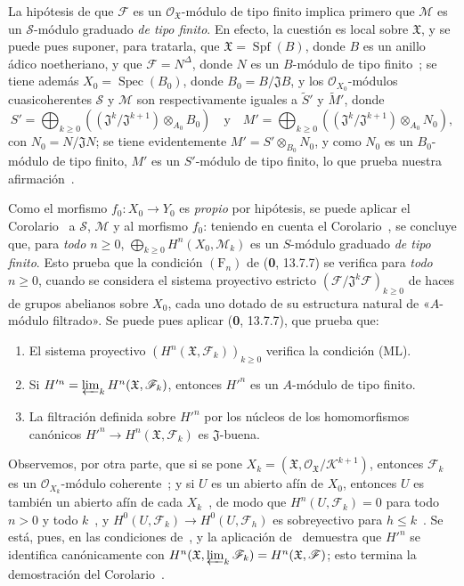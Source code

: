 La hipótesis de que $\mathcal F$ es un $\mathcal O_{\mathfrak X}$-módulo de tipo finito implica primero que $\mathcal M$ es
un $\mathcal S$-módulo graduado \emph{de tipo finito}.
En efecto, la cuestión es local sobre $\mathfrak X$, y se puede pues suponer, para tratarla, que $\mathfrak X=\operatorname{Spf}(B)$, donde $B$ es un anillo ádico noetheriano, y que $\mathcal F=N^\Delta$, donde $N$ es un $B$-módulo de tipo finito~; se tiene además $X_0=\operatorname{Spec}(B_0)$, donde $B_0=B/\mathfrak J B$, y los $\mathcal O_{X_0}$-módulos cuasicoherentes $\mathcal S$ y $\mathcal M$ son respectivamente iguales a $\widetilde{S}'$ y $\widetilde{M}'$, donde
\[
S'=\bigoplus_{k\geq0}
((\mathfrak J^k/\mathfrak J^{k+1})\otimes_{A_0}B_0)\quad\text{y}\quad
M'=\bigoplus_{k\geq0}
((\mathfrak J^k/\mathfrak J^{k+1})\otimes_{A_0}N_0),
\]
con $N_0=N/\mathfrak JN$; se tiene evidentemente $M'=S'\otimes_{B_0}N_0$, y como $N_0$ es un $B_0$-módulo de tipo finito, $M'$ es un $S'$-módulo de tipo finito, lo que prueba nuestra afirmación~.

Como el morfismo $f_0:X_0\to Y_0$ es \emph{propio} por hipótesis, se puede aplicar el Corolario~ a $\mathcal S$, $\mathcal M$ y al morfismo $f_0$: teniendo en cuenta el Corolario~, se concluye que, para \emph{todo $n\geq0$}, $\bigoplus_{k\geq0}H^n(X_0,\mathcal M_k)$ es un $S$-módulo graduado \emph{de
tipo finito}. Esto prueba que la condición $(\mathrm F_n)$ de (\textbf{0}, 13.7.7) se
verifica para \emph{todo $n\geq0$}, cuando se considera el sistema proyectivo estricto $(\mathcal F/\mathfrak J^k\mathcal F)_{k\geq0}$ de haces de grupos abelianos sobre $X_0$, cada uno dotado de su estructura natural de «$A$-módulo filtrado». Se puede pues aplicar (\textbf{0}, 13.7.7), que prueba que:
\begin{enumerate}
\item[$1^\circ$] El sistema proyectivo
$(H^n(\mathfrak X,\mathcal F_k))_{k\geq0}$ verifica la condición (ML).
\item[$2^\circ$] Si
$H'^{n}=\varprojlim_kH^n(\mathfrak X,\mathcal F_k)$, entonces $H'^{n}$ es un $A$-módulo de tipo finito.
\item[$3^\circ$] La filtración definida sobre $H'^{n}$ por los núcleos de los homomorfismos canónicos $H'^{n}\to H^n(\mathfrak X,\mathcal F_k)$ es $\mathfrak J$-buena.
\end{enumerate}

Observemos, por otra parte, que si se pone $X_k=(\mathfrak X,\mathcal O_{\mathfrak X}/\mathcal K^{k+1})$, entonces $\mathcal F_k$ es un $\mathcal O_{X_k}$-módulo coherente~; y si $U$ es un abierto afín de $X_0$, entonces $U$ es también un abierto afín de cada $X_k$~, de modo que $H^n(U,\mathcal F_k)=0$ para todo $n>0$ y todo $k$~, y $H^0(U,\mathcal F_k)\to H^0(U,\mathcal F_h)$ es sobreyectivo para $h\leq k$~.
Se está, pues, en las condiciones de~, y la aplicación de~ demuestra que $H'^{n}$ se identifica canónicamente con $H^n(\mathfrak X,\varprojlim_k\mathcal F_k)=H^n(\mathfrak X,\mathcal F)$; esto termina la demostración del Corolario~.

